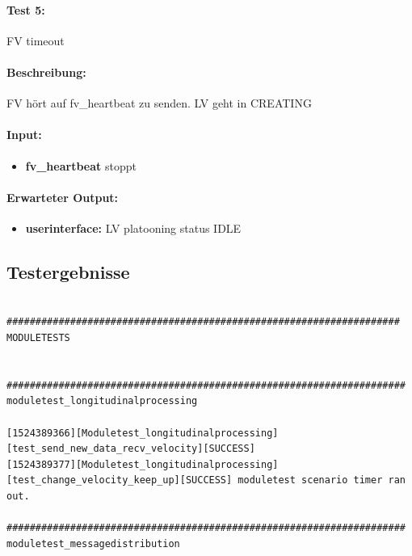 \documentclass[a4paper, 12pt, titlepage]{scrartcl}
\begin{document}
{			\paragraph{Test 5:}{FV timeout}
			\paragraph{Beschreibung:} FV hört auf fv\_heartbeat zu senden. LV geht in CREATING
			\paragraph{Input:}
			\begin{itemize} \itemsep-0.5em
				\item \textbf{fv\_heartbeat} stoppt
			\end{itemize}

			\paragraph{Erwarteter Output:}
			\begin{itemize} \itemsep-0.5em
				\item \textbf{userinterface:} LV platooning status IDLE
			\end{itemize}

		\subsection{Testergebnisse}
		\label{test_ergebnisse}

		\begin{lstlisting}[basicstyle=\tiny]

####################################################################
MODULETESTS


#####################################################################
moduletest_longitudinalprocessing

[1524389366][Moduletest_longitudinalprocessing][test_send_new_data_recv_velocity][SUCCESS]
[1524389377][Moduletest_longitudinalprocessing][test_change_velocity_keep_up][SUCCESS] moduletest scenario timer ran out.

#####################################################################
moduletest_messagedistribution


\end{lstlisting}}
\end{document}
